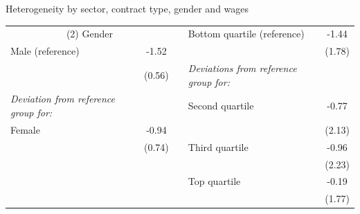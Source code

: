 \documentclass[aspectratio=169]{beamer}
\begin{document}
\begin{frame}{Heterogeneity by sector, contract type, gender and wages \hyperlink{heterogeneity_slide}{}}
\begin{table}[t!]
{\begin{threeparttable}
\begin{tabular}{lcclc}
\cmidrule{4-5}    \multicolumn{2}{c}{(2) Gender} &       & Bottom quartile (reference) & -1.44 \\
\cmidrule{1-2}    Male (reference) & -1.52\sym{***} &       &       & (1.78) \\
          & (0.56) &       & \textit{Deviations from reference group for:} &  \\
    \textit{Deviation from reference group for:} &       &       & Second quartile & -0.77 \\
    Female & -0.94 &       &       & (2.13) \\
          & (0.74) &       & Third quartile & -0.96 \\
          &       &       &       & (2.23) \\
          &       &       & Top quartile & -0.19 \\
          &       &       &       & (1.77) \\
    \bottomrule
    \end{tabular}%
          \end{threeparttable}
          }
\end{table}%
\end{frame}
\end{document}
